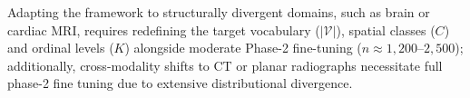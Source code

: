 \documentclass[journal]{IEEEtran}
\begin{document}
Adapting the framework to structurally divergent domains, such as brain or cardiac MRI, requires redefining the target vocabulary ($|\mathcal{V}|$), spatial classes ($C$) and ordinal levels ($K$) alongside moderate Phase-2 fine-tuning ($n \approx 1,200\text{--}2,500$); additionally, cross-modality shifts to CT or planar radiographs necessitate full phase-2 fine tuning due to extensive distributional divergence.



\end{document}
